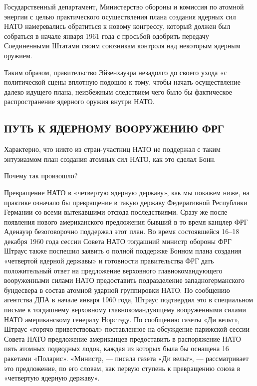 \documentclass[12pt, a4paper, openany]{book}
\begin{document}
Государственный департамент, Министерство обороны и комиссия по атомной энергии с целью практического осуществления плана создания ядерных сил НАТО намеревались обратиться к новому конгрессу, который должен был собраться в начале января 1961 года с просьбой одобрить передачу Соединенными Штатами своим союзникам контроля над некоторым ядерным оружием.
	
Таким образом, правительство Эйзенхауэра незадолго до своего ухода «с политической сцены вплотную подошло к тому, чтобы начать осуществление далеко идущего плана, неизбежным следствием чего было бы фактическое распространение ядерного оружия внутри НАТО.
	
\subsection[Путь к ядерному вооружению ФРГ]{\center ПУТЬ К ЯДЕРНОМУ ВООРУЖЕНИЮ ФРГ}
	
Характерно, что никто из стран-участниц НАТО не поддержал с таким энтузиазмом план создания атомных сил НАТО, как это сделал Бонн.
	
Почему так произошло?
	
Превращение НАТО в «четвертую ядерную державу», как мы покажем ниже, на практике означало бы превращение в такую державу Федеративной Республики Германии со всеми вытекавшими отсюда последствиями. Сразу же после появления нового американского предложения бывший в то время канцлер ФРГ Аденауэр безоговорочно поддержал этот план. Во время состоявшейся 16–18 декабря 1960 года сессии Совета НАТО тогдашний министр обороны ФРГ Штраус также поспешил заявить о полной поддержке Бонном плана создания «четвертой ядерной державы» и готовности правительства ФРГ дать положительный ответ на предложение верховного главнокомандующего вооруженными силами НАТО предоставить подразделение западногерманского бундесвера в состав атомной ударной группировки НАТО. По сообщению агентства ДПА в начале января 1960 года, Штраус подтвердил это в специальном письме к тогдашнему верховному главнокомандующему вооруженными силами НАТО американскому генералу Норстэду. По сообщению газеты «Ди вельт», Штраус «горячо приветствовал» поставленное на обсуждение парижской сессии Совета НАТО предложение американцев предоставить в распоряжение НАТО пять атомных подводных лодок, каждая из которых была бы оснащена 16 ракетами «Поларис». «Министр, — писала газета «Ди вельт», — рассматривает это предложение, по его словам, как первую ступень к превращению союза в «четвертую ядерную державу».
		
\end{document}
